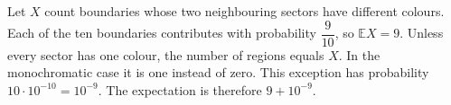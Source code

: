 Let $X$ count boundaries whose two neighbouring sectors have different colours. Each of the ten boundaries contributes with probability $\dfrac{9}{10}$, so $\mathbb{E} X=9$. Unless every sector has one colour, the number of regions equals $X$. In the monochromatic case it is one instead of zero. This exception has probability $10\cdot10^{-10}=10^{-9}$. The expectation is therefore $\boxed{9+10^{-9}}$.
